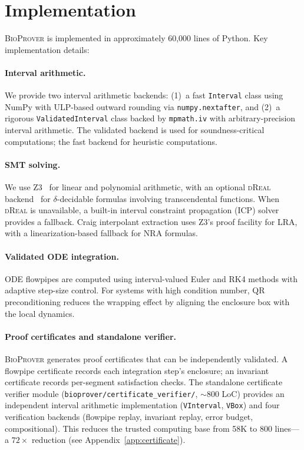 \documentclass[11pt]{article}
\newcommand{\bioprover}{\textsc{BioProver}}
\newcommand{\dreal}{\textsc{dReal}}
\begin{document}
\section{Implementation}
\label{sec:implementation}

\bioprover{} is implemented in approximately 60,000 lines of Python.
Key implementation details:

\paragraph{Interval arithmetic.}
We provide two interval arithmetic backends: (1)~a fast
\texttt{Interval} class using NumPy with ULP-based outward rounding
via \texttt{numpy.nextafter}, and (2)~a rigorous
\texttt{ValidatedInterval} class backed by \texttt{mpmath.iv} with
arbitrary-precision interval arithmetic. The validated backend is used
for soundness-critical computations; the fast backend for heuristic
computations.

\paragraph{SMT solving.}
We use Z3~\cite{demoura2008z3} for linear and polynomial arithmetic,
with an optional \dreal{} backend~\cite{gao2013dreal} for
$\delta$-decidable formulas involving transcendental functions. When
\dreal{} is unavailable, a built-in interval constraint propagation
(ICP) solver provides a fallback. Craig interpolant extraction uses
Z3's proof facility for LRA, with a linearization-based fallback for
NRA formulas.

\paragraph{Validated ODE integration.}
ODE flowpipes are computed using interval-valued Euler and RK4
methods with adaptive step-size control. For systems with high
condition number, QR preconditioning reduces the wrapping effect by
aligning the enclosure box with the local dynamics.

\paragraph{Proof certificates and standalone verifier.}
\bioprover{} generates proof certificates that can be independently
validated. A flowpipe certificate records each integration step's
enclosure; an invariant certificate records per-segment satisfaction
checks. The standalone certificate verifier module
(\texttt{bioprover/certificate\_verifier/}, $\sim$800 LoC) provides
an independent interval arithmetic implementation (\texttt{VInterval},
\texttt{VBox}) and four verification backends (flowpipe replay,
invariant replay, error budget, compositional). This reduces the
trusted computing base from 58K to 800 lines---a $72\times$ reduction
(see Appendix~\ref{app:certificate}).
\end{document}
